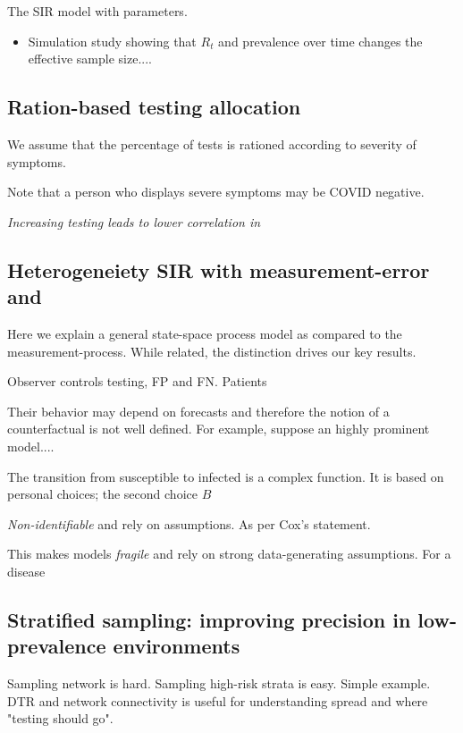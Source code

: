 \documentclass[12pt]{article}
\numberwithin{equation}{section}
\theoremstyle{plain}
\begin{document}
The SIR model with parameters.

\begin{itemize}
\item Simulation study showing that $R_t$ and prevalence over time changes the effective sample size....
\end{itemize}

\subsection{Ration-based testing allocation}

We assume that the percentage of tests is rationed according to severity of symptoms.

Note that a person who displays severe symptoms may be COVID negative.



\emph{Increasing testing leads to lower correlation in}


\subsection{Heterogeneiety  SIR with measurement-error and }

Here we explain a general state-space process model as compared to the measurement-process.  While related, the distinction drives our key results.

Observer controls testing, FP and FN.  Patients

Their behavior may depend on forecasts and therefore the notion of a counterfactual is not well defined.  For example, suppose an highly prominent model....

The transition from susceptible to infected is a complex function.  It is based on personal choices;  the second choice
$B$

\emph{Non-identifiable} and rely on assumptions.  As per Cox's statement.

This makes models \emph{fragile} and rely on strong data-generating assumptions.  For a disease

\subsection{Stratified sampling: improving precision in low-prevalence environments}

Sampling network is hard.  Sampling high-risk strata is easy.  Simple example.
DTR and network connectivity is useful for understanding spread and where "testing should go".
\end{document}
